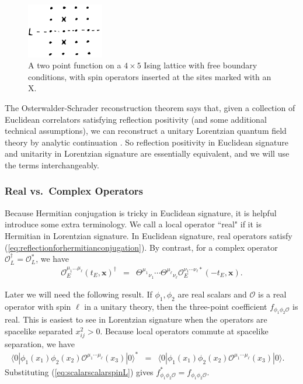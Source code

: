 \documentclass{ws-rv9x6}
\newcommand\be{\begin{eqnarray}}
\newcommand\ee{\end{eqnarray}}
\newcommand\f\phi
\newcommand\cO{\mathcal{O}}
\newcommand\<\langle
\renewcommand\>\rangle
\newcommand\bx{\mathbf{x}}
\renewcommand\.{\cdot}
\newcommand\x\times
\begin{document}
\begin{figure}
\begin{center}
\includegraphics[width=0.3\textwidth]{isingreflectioncorrelator.jpg}
\end{center}
\caption{A two point function on a $4\x 5$ Ising lattice with free boundary conditions, with spin operators  inserted at the sites marked with an X.  \label{fig:isingreflectioncorrelator}}
\end{figure}

The Osterwalder-Schrader reconstruction theorem says that, given a collection of Euclidean correlators satisfying reflection positivity (and some additional technical assumptions), we can reconstruct a unitary Lorentzian quantum field theory by analytic continuation \cite{GlimmJaffe}.  So reflection positivity in Euclidean signature and unitarity in Lorentzian signature are essentially equivalent, and we will use the terms interchangeably. 

\subsubsection{Real vs.\ Complex Operators}
\label{sec:realvscomplex}

Because Hermitian conjugation is tricky in Euclidean signature, it is helpful introduce some extra terminology.  We call a local operator ``real" if it is Hermitian in Lorentzian signature.  In Euclidean signature, real operators satisfy (\ref{eq:reflectionforhermitianconjugation}).  By contrast, for a complex operator $\cO_L^\dag = \cO_L^*$, we have
\be
\cO_E^{\mu_1\dots\mu_\ell}(t_E,\bx)^\dag &=& \Theta^{\mu_1}{}_{\nu_1}\cdots \Theta^{\mu_\ell}{}_{\nu_\ell} \cO_E^{\nu_1\cdots\nu_\ell*}(-t_E,\bx).
\ee

Later we will need the following result.
If $\f_1,\f_2$ are real scalars and $\cO$ is a real operator with spin $\ell$ in a unitary theory, then the three-point coefficient $f_{\f_1\f_2\cO}$ is real. This is easiest to see in Lorentzian signature when the operators are spacelike separated $x_{ij}^2>0$. Because local operators commute at spacelike separation, we have
\be
\<0|\f_1(x_1)\f_2(x_2) \cO^{\mu_1\cdots\mu_\ell}(x_3)|0\>^* &=& \<0|\f_1(x_1)\f_2(x_2) \cO^{\mu_1\cdots\mu_\ell}(x_3)|0\>.\quad
\ee
Substituting (\ref{eq:scalarscalarspinL}) gives $f_{\f_1\f_2\cO}^*=f_{\f_1\f_2\cO}$.
\end{document}
